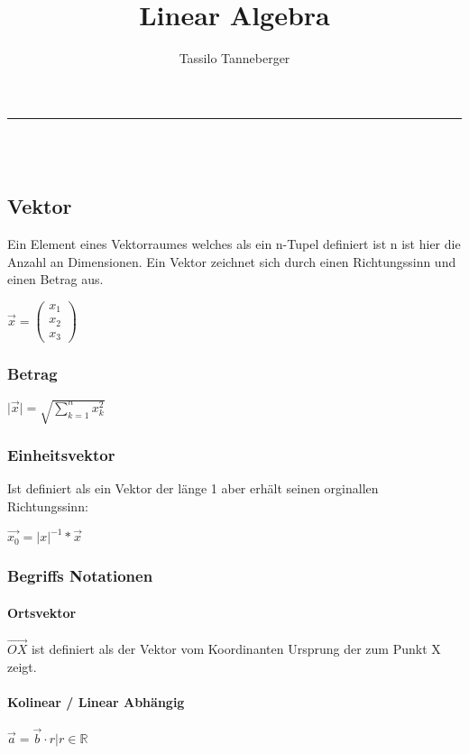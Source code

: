 \documentclass[12pt]{article}
\title{Linear Algebra}
\author{Tassilo Tanneberger}
\makeatletter
\newcommand{\linia}{\rule{\linewidth}{0.5pt}}
\renewcommand{\maketitle}{\begin{center}
\huge \@title\end{center}
\linia\\
{\large\@author\hfill\@date\\}}
\makeatother
\begin{document}
\maketitle


\newcommand{\ihat}{\hat{\textbf{\i}}}
\newcommand{\jhat}{\hat{\textbf{\j}}}

\subsection*{ Vektor }

Ein Element eines Vektorraumes welches als ein n-Tupel definiert ist n ist hier die Anzahl an Dimensionen. Ein Vektor zeichnet sich durch einen Richtungssinn und einen Betrag aus.

\( \overrightarrow{x} = \begin{pmatrix}
	x_1 \\ x_2 \\ x_3
\end{pmatrix} \) 

\subsubsection*{ Betrag }

\( \vert \overrightarrow{x} \vert  = \sqrt{\sum_{k=1}^n x_k^2} \)

\subsubsection*{ Einheitsvektor }

Ist definiert als ein Vektor der länge 1 aber erhält seinen orginallen Richtungssinn:

\( \overrightarrow{x_0} = \vert x \vert ^{-1} * \overrightarrow{x} \)

\subsubsection*{ Begriffs Notationen}

\paragraph*{Ortsvektor} \( \overrightarrow{OX} \) ist definiert als der Vektor vom Koordinanten Ursprung der zum Punkt X zeigt. \newline

\paragraph*{Kolinear / Linear Abhängig} \( \overrightarrow{a} = \overrightarrow{b} \cdot r \vert r \in \mathbb{R}\) 
\end{document}
